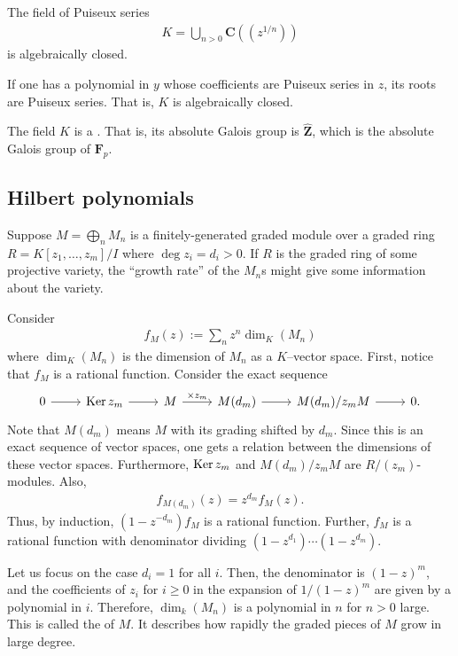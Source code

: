 \documentclass [11 pt, oneside] {article}
\begin{document}
\begin{corollary}[ ]\label{}\text{}
The field of Puiseux series
\begin{align*}
	K = \bigcup_{n>0} \mathbf{C} (\!(z^{1/n})\!)
\end{align*}
is algebraically closed.
\end{corollary}

If one has a polynomial in $y$ whose coefficients are Puiseux series in $z$, its roots are Puiseux series. That is, $K$ is algebraically closed.

The field $K$ is a . That is, its absolute Galois group is $\widehat{\mathbf{Z}}$, which is the absolute Galois group of $\mathbf{F}_{p}$.

\subsection{Hilbert polynomials}
Suppose $M=\bigoplus_{n}M_n$ is a finitely-generated graded module over a graded ring $R = K[z_1,\hdots, z_m]/I$ where $\deg z_i = d_i >0$. If $R$ is the graded ring of some projective variety, the ``growth rate'' of the $M_n$s might give some information about the variety.

Consider
\begin{align*}
	f_M(z) :=  \sum_{n}^{} z^n\dim_K(M_n)
\end{align*}
where $\dim_K(M_n)$ is the dimension of $M_n$ as a $K$--vector space. First, notice that $f_M$ is a rational function. Consider the exact sequence
\[
\begin{tikzcd}
	0\ar[r]&\Ker z_m \ar[r] & M \ar[r,"\times z_m"]& M(d_m) \ar[r] & M(d_m)/z_m M \ar[r]& 0. 
\end{tikzcd}
\]
Note that $M(d_m)$ means $M$ with its grading shifted by $d_m$. Since this is an exact sequence of vector spaces, one gets a relation between the dimensions of these vector spaces. Furthermore, $\operatorname{Ker} z_m$ and $M(d_m)/z_m M$ are $R/(z_m)$-modules. Also,
\begin{align*}
	f_{M(d_m)}(z) = z^{d_m} f_M(z).
\end{align*}
Thus, by induction, $(1-z^{-d_m})f_M$ is a rational function. Further, $f_M$ is a rational function with denominator dividing $(1-z^{d_1})\cdots(1-z^{d_m})$.

Let us focus on the case $d_i=1$ for all $i$. Then, the denominator is $(1-z)^m$, and the coefficients of $z_i$ for $i\ge 0$ in the expansion of $1/(1-z)^m$ are given by a polynomial in $i$. Therefore, $\dim_k (M_n)$ is a polynomial in $n$ for $n>0$ large. This is called the  of $M$. It describes how rapidly the graded pieces of $M$ grow in large degree.
\end{document}
